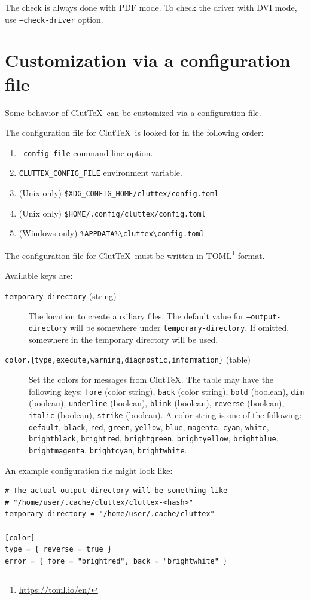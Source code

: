 \documentclass[a4paper]{report}
\newcommand\ClutTeX{Clut\TeX}
\begin{document}
The check is always done with PDF mode.
To check the driver with DVI mode, use \texttt{--check-driver} option.

\section{Customization via a configuration file}\label{sec:config-file}

Some behavior of \ClutTeX\ can be customized via a configuration file.

The configuration file for \ClutTeX\ is looked for in the following order:
\begin{enumerate}
\item \texttt{--config-file} command-line option.
\item \texttt{CLUTTEX\_CONFIG\_FILE} environment variable.
\item (Unix only) \texttt{\$XDG\_CONFIG\_HOME/cluttex/config.toml}
\item (Unix only) \texttt{\$HOME/.config/cluttex/config.toml}
\item (Windows only) \texttt{\%APPDATA\%\textbackslash cluttex\textbackslash config.toml}
\end{enumerate}

The configuration file for \ClutTeX\ must be written in TOML\footnote{\url{https://toml.io/en/}} format.

Available keys are:
\begin{description}
\item[\texttt{temporary-directory} (string)]
  The location to create auxiliary files.
  The default value for \texttt{--output-directory} will be somewhere under \texttt{temporary-directory}.
  If omitted, somewhere in the temporary directory will be used.
\item[\texttt{color.\{type,execute,warning,diagnostic,information\}} (table)]
  Set the colors for messages from \ClutTeX.
  The table may have the following keys:
  \texttt{fore} (color string),
  \texttt{back} (color string),
  \texttt{bold} (boolean),
  \texttt{dim} (boolean),
  \texttt{underline} (boolean),
  \texttt{blink} (boolean),
  \texttt{reverse} (boolean),
  \texttt{italic} (boolean),
  \texttt{strike} (boolean).
  A color string is one of the following:
  \texttt{default},
  \texttt{black},
  \texttt{red},
  \texttt{green},
  \texttt{yellow},
  \texttt{blue},
  \texttt{magenta},
  \texttt{cyan},
  \texttt{white},
  \texttt{brightblack},
  \texttt{brightred},
  \texttt{brightgreen},
  \texttt{brightyellow},
  \texttt{brightblue},
  \texttt{brightmagenta},
  \texttt{brightcyan},
  \texttt{brightwhite}.
\end{description}

An example configuration file might look like:
\begin{verbatim}
# The actual output directory will be something like
# "/home/user/.cache/cluttex/cluttex-<hash>"
temporary-directory = "/home/user/.cache/cluttex"

[color]
type = { reverse = true }
error = { fore = "brightred", back = "brightwhite" }
\end{verbatim}
\end{document}
